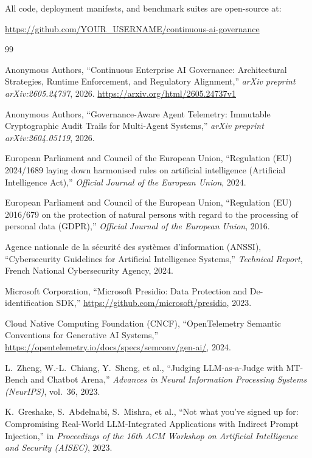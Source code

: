 \documentclass[11pt,a4paper]{article}
\begin{document}
All code, deployment manifests, and benchmark suites are open-source at:
\begin{center}
\url{https://github.com/YOUR_USERNAME/continuous-ai-governance}
\end{center}

\begin{thebibliography}{99}

Anonymous Authors, ``Continuous Enterprise AI Governance: Architectural Strategies, Runtime Enforcement, and Regulatory Alignment,'' \textit{arXiv preprint arXiv:2605.24737}, 2026. \url{https://arxiv.org/html/2605.24737v1}

Anonymous Authors, ``Governance-Aware Agent Telemetry: Immutable Cryptographic Audit Trails for Multi-Agent Systems,'' \textit{arXiv preprint arXiv:2604.05119}, 2026.

European Parliament and Council of the European Union, ``Regulation (EU) 2024/1689 laying down harmonised rules on artificial intelligence (Artificial Intelligence Act),'' \textit{Official Journal of the European Union}, 2024.

European Parliament and Council of the European Union, ``Regulation (EU) 2016/679 on the protection of natural persons with regard to the processing of personal data (GDPR),'' \textit{Official Journal of the European Union}, 2016.

Agence nationale de la s{\'e}curit{\'e} des syst{\`e}mes d'information (ANSSI), ``Cybersecurity Guidelines for Artificial Intelligence Systems,'' \textit{Technical Report}, French National Cybersecurity Agency, 2024.

Microsoft Corporation, ``Microsoft Presidio: Data Protection and De-identification SDK,'' \url{https://github.com/microsoft/presidio}, 2023.

Cloud Native Computing Foundation (CNCF), ``OpenTelemetry Semantic Conventions for Generative AI Systems,'' \url{https://opentelemetry.io/docs/specs/semconv/gen-ai/}, 2024.

L.~Zheng, W.-L.~Chiang, Y.~Sheng, et al., ``Judging LLM-as-a-Judge with MT-Bench and Chatbot Arena,'' \textit{Advances in Neural Information Processing Systems (NeurIPS)}, vol.~36, 2023.

K.~Greshake, S.~Abdelnabi, S.~Mishra, et al., ``Not what you've signed up for: Compromising Real-World LLM-Integrated Applications with Indirect Prompt Injection,'' in \textit{Proceedings of the 16th ACM Workshop on Artificial Intelligence and Security (AISEC)}, 2023.


\end{thebibliography}
\end{document}
